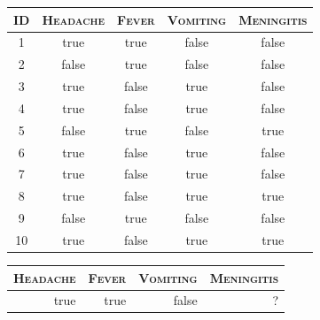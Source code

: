 \documentclass[xcolor={table}]{beamer}
\newcommand{\featN}[1]{\textsc{#1}}
\begin{document}
\begin{frame}[plain]
\begin{table}[!tb]
\centering
\begin{footnotesize}
\begin{tabular}{ccccc}
\hline
\featN{ID} & \featN{Headache} & \featN{Fever} & \featN{Vomiting} & \featN{Meningitis}\\
\hline
1 & true & true & false & false\\
2 & false & true & false & false\\
3 & true & false & true & false\\
4 & true & false & true & false\\
5 & false & true & false & true\\
6 & true & false & true & false\\
7 & true & false & true & false\\
8 & true & false & true & true\\
9 & false & true & false & false\\
10 & true & false & true & true\\
\hline
\end{tabular}
\end{footnotesize}
\end{table}

\begin{table}
\begin{footnotesize}
\begin{tabular}{rrrr}
\hline
\featN{Headache} & \featN{Fever} & \featN{Vomiting} & \featN{Meningitis}\\
\hline
true & true & false & ?\\
\hline
\end{tabular}
\end{footnotesize}
\end{table}
\end{frame}
\end{document}
